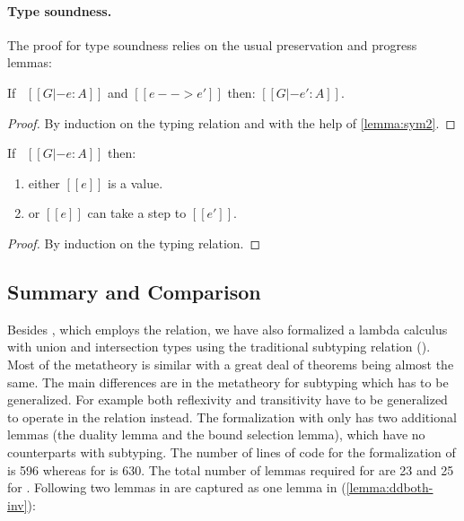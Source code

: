 \paragraph{Type soundness.}
The proof for type soundness relies on the usual preservation and progress lemmas:

\begin{lemma}
  If \ $[[G |- e : A ]]$ and $[[e --> e' ]]$ then: $[[G |- e' : A ]]$.
\end{lemma}

\begin{proof}
  By induction on the typing relation and with the help of \cref{lemma:sym2}.
\end{proof}

\begin{lemma}[Progress]
  If \ $[[G |- e : A ]]$ then:
 \begin{enumerate}
  \item either $[[e]]$ is a value.
  \item or $[[e]]$ can take a step to $[[e']]$.
  \end{enumerate}
\end{lemma}

\begin{proof}
  By induction on the typing relation.
  
 
\end{proof}

\subsection{Summary and Comparison}
\label{sec:algorithm:3}

Besides \ui, which employs the \nameduo relation, we have also formalized
a lambda calculus with union and intersection types using the traditional
subtyping relation (\stlciu). Most of the metatheory is similar with a great deal
of theorems being almost the same. The main differences are in the
metatheory for subtyping which has to be generalized.
For example both reflexivity and transitivity have to be generalized to
operate in the \nameduo relation instead. The formalization
with \nameduo only has two additional lemmas (the duality lemma and the bound selection lemma), which have
no counterparts with subtyping. The number of lines of code for the formalization of \stlciu is 596 whereas for \gstlciu is 630.
The total number of lemmas required for \stlciu are 23 and 25 for \gstlciu.
Following two lemmas in \stlciu are captured as one lemma in \gstlciu (\cref{lemma:ddboth-inv}):

